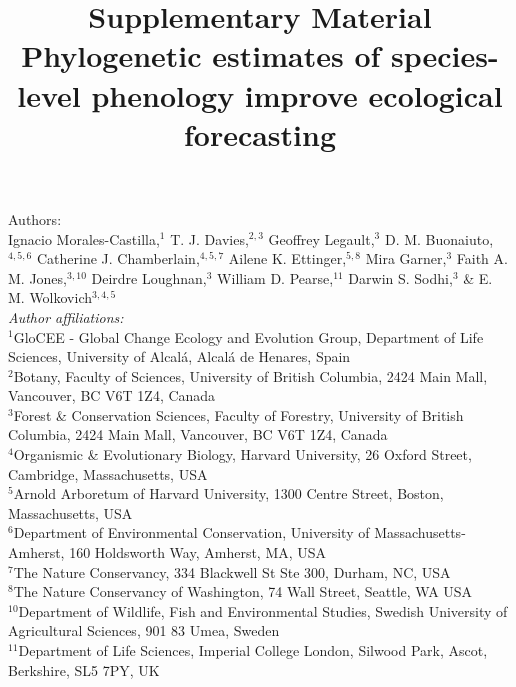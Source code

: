 \documentclass[11pt]{article}
\begin{document}



\title{Supplementary Material\\
Phylogenetic estimates of species-level phenology improve ecological forecasting}
\author{} %
\maketitle


\noindent Authors:\\
Ignacio Morales-Castilla,$^{1}$ T. J. Davies,$^{2,3}$ Geoffrey Legault,$^{3}$ D. M. Buonaiuto,$^{4,5,6}$ Catherine J. Chamberlain,$^{4,5,7}$ Ailene K. Ettinger,$^{5,8}$ Mira Garner,$^{3}$ Faith A. M. Jones,$^{3,10}$ Deirdre Loughnan,$^{3}$ William D. Pearse,$^{11}$ Darwin S. Sodhi,$^{3}$ \& E. M. Wolkovich$^{3,4,5}$  \vspace{2ex}\\
\emph{Author affiliations:}\\
$^{1}$GloCEE - Global Change Ecology and Evolution Group, Department of Life Sciences, University of Alcal\'a, Alcal\'a de Henares, Spain\\ %
 $^{2}$Botany, Faculty of Sciences, University of British Columbia, 2424 Main Mall, Vancouver, BC V6T 1Z4, Canada\\
$^{3}$Forest \& Conservation Sciences, Faculty of Forestry, University of British Columbia, 2424 Main Mall, Vancouver, BC V6T 1Z4, Canada\\
$^{4}$Organismic \& Evolutionary Biology, Harvard University, 26 Oxford Street, Cambridge, Massachusetts, USA\\
$^{5}$Arnold Arboretum of Harvard University, 1300 Centre Street, Boston, Massachusetts, USA\\
$^{6}$Department of Environmental Conservation, University of Massachusetts-Amherst, 160 Holdsworth Way, Amherst, MA, USA\\  %
 $^{7}$The Nature Conservancy, 334 Blackwell St Ste 300, Durham, NC, USA \\ %
$^{8}$The Nature Conservancy of Washington, 74 Wall Street, Seattle, WA  USA \\ %
$^{10}$Department of Wildlife, Fish and Environmental Studies, Swedish University of Agricultural Sciences, 901 83 Umea, Sweden\\ %
$^{11}$Department of Life Sciences, Imperial College London, Silwood Park, Ascot, Berkshire, SL5 7PY, UK\\
\end{document}
